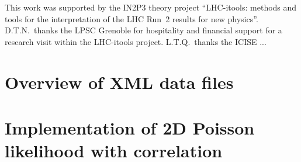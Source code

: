 \documentclass[submission, Phys]{SciPost}
\begin{document}

This work was supported by the IN2P3 theory project 
``LHC-itools: methods and tools for the interpretation of the LHC Run~2 results for new physics''. 
D.T.N.\ thanks the LPSC Grenoble for hospitality and financial support for a research visit within the LHC-itools project. 
L.T.Q.\ thanks the ICISE ...


\begin{appendix}

\section{Overview of XML data files}

\section{Implementation of 2D Poisson likelihood with correlation}


\end{appendix}





\nolinenumbers
\end{document}
